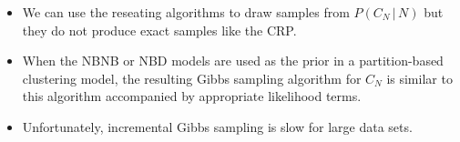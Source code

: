 \documentclass[portrait,a0b,final]{a0poster}
\newcommand{\g}{\,|\,}
\newenvironment{poster}{
  \begin{center}
  \begin{minipage}[c]{0.98\textwidth}
}{
  \end{minipage}
  \end{center}
}
\begin{document}
\begin{poster}
\begin{multicols}{3}


\begin{itemize}
\item We can use the reseating algorithms to draw samples from $P(C_N \g N)$ but they do not 
produce exact samples like the CRP.
\item  When the NBNB or NBD
models are used as the prior in a partition-based clustering
model, the
resulting Gibbs sampling algorithm for $C_N$ is similar to this
algorithm accompanied by appropriate likelihood
terms. 
\item Unfortunately, incremental Gibbs sampling is slow for large data sets. 
\end{itemize}

\vspace*{1em}


\end{multicols}
\end{poster}
\end{document}
